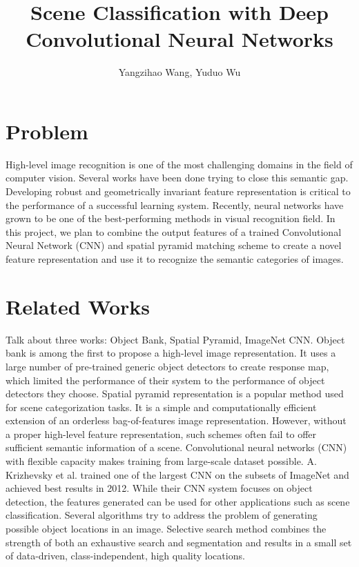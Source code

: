 \documentclass[letterpaper,twocolumn,11pt]{article}
\title{Scene Classification with Deep Convolutional Neural Networks}
\author{Yangzihao Wang, Yuduo Wu}
\date{} %
\begin{document}
\maketitle

\section{Problem}
High-level image recognition is one of the most challenging domains in the
field of computer vision. Several works have been done trying to close this
semantic gap. Developing robust and geometrically invariant feature
representation is critical to the performance of a successful learning system.
Recently, neural networks have grown to be one of the best-performing methods
in visual recognition field. In this project, we plan to combine the output
features of a trained Convolutional Neural Network (CNN) and spatial pyramid
matching scheme to create a novel feature representation and use it to
recognize the semantic categories of images.

\section{Related Works}
Talk about three works: Object Bank, Spatial Pyramid, ImageNet CNN.  Object
bank\cite{OB} is among the first to propose a high-level image representation.
It uses a large number of pre-trained generic object detectors to create
response map, which limited the performance of their system to the performance
of object detectors they choose. Spatial pyramid representation\cite{SPM} is
a popular method used for scene categorization tasks. It is a simple and
computationally efficient extension of an orderless bag-of-features image
representation. However, without a proper high-level feature representation,
such schemes often fail to offer sufficient semantic information of a scene.
Convolutional neural networks (CNN) with flexible capacity makes training from
large-scale dataset possible. A. Krizhevsky et al.\cite{CNN} trained one of the
largest CNN on the subsets of ImageNet and achieved best results in 2012. While
their CNN system focuses on object detection, the features generated can be
used for other applications such as scene classification. Several algorithms
try to address the problem of generating possible object locations in an image.
Selective search method combines the strength of both an exhaustive search and
segmentation and results in a small set of data-driven, class-independent, high
quality locations.
\end{document}
